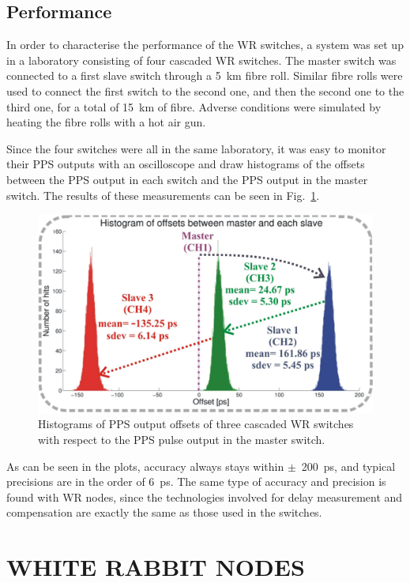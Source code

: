 \documentclass{../JAC2003}
\begin{document}
\subsection{Performance}

In order to characterise the performance of the WR switches, a system
was set up in a laboratory consisting of four cascaded WR
switches. The master switch was connected to a first slave switch
through a 5~km fibre roll. Similar fibre rolls were used to connect
the first switch to the second one, and then the second one to the
third one, for a total of 15~km of fibre. Adverse conditions were
simulated by heating the fibre rolls with a hot air gun. 

Since the four switches were all in the same laboratory, it was easy
to monitor their PPS outputs with an oscilloscope and draw histograms
of the offsets between the PPS output in each switch and the PPS
output in the master switch. The results of these measurements can be
seen in Fig.~\ref{performance-fig}.

\begin{figure}[htb]
   \centering
   \includegraphics*[width=\columnwidth]{measurements/meas_results2.pdf}
   \caption{Histograms of PPS output offsets of three cascaded WR
     switches with respect to the PPS pulse output in the master switch.}
   \label{performance-fig}
\end{figure}

As can be seen in the plots, accuracy always stays within
$\pm$~200~ps, and typical precisions are in the order of 6~ps. The
same type of accuracy and precision is found with WR nodes, since the
technologies involved for delay measurement and compensation are
exactly the same as those used in the switches.

\section{WHITE RABBIT NODES}
\end{document}
